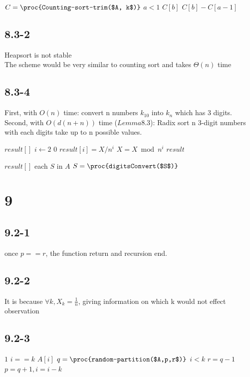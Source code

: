 \documentclass[]{article}
\begin{document}
\begin{codebox}
	\li $C = \proc{Counting-sort-trim($A, k$)}$
	\li \If $a < 1$
	\li \Then \Return $C[b]$
	\li \Else \Return $C[b] - C[a-1]$
\end{codebox}

\subsection{8.3-2}
Heapsort is not stable\\
The scheme would be very similar to counting sort and takes $\Theta(n)$ time

\subsection{8.3-4}
First, with $O(n)$ time: convert n numbers $k_{10}$ into $k_{n}$ which has 3 digits.\\
Second, with $O(d(n+n))$ time ($Lemma8.3$): Radix sort n 3-digit numbers with each digits take up to n possible values.

\begin{codebox}
	\li $result []$
	\li \For $i \gets 2$ \Downto $0$
	\li		\Do $result[i] = X/n^i$
	\li			$X = X \bmod{n^i}$
	\End
	\li \Return $result$
\end{codebox}

\begin{codebox}
	\li $result []$
	\li \For each $S$ in $A$
	\li		\Do $S =\proc{digitsConvert($S$)}$
	\End
	\li {}
\end{codebox}

\section{9}

\subsection{9.2-1}
once $p == r$, the function return and recursion end.

\subsection{9.2-2}
It is because $\forall k, X_{k} = \frac{1}{n}$, giving information on which k would not effect observation

\subsection{9.2-3}
\begin{codebox}
	\li \While $1$
	\li	\Do \If $i == k$
	\li  \Then \Return $A[i]$
	\li \Else 
	\li  $q =\proc{random-partition($A,p,r$)}$
	\li 	\If $i < k$
	\li     \Then $r = q-1$
	\li 	\Else $p = q+1, i = i-k$
	\End
	\End
	\End
\end{codebox}
\end{document}
